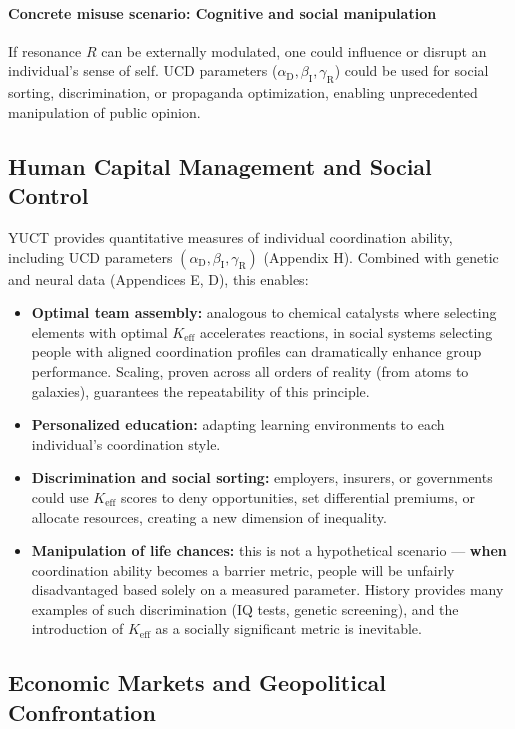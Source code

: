 \documentclass[12pt,a4paper]{article}
\theoremstyle{remark}
\newcommand{\Keff}{K_{\mathrm{eff}}}
\newcommand{\alD}{\alpha_{\mathrm{D}}}
\newcommand{\beI}{\beta_{\mathrm{I}}}
\newcommand{\gaR}{\gamma_{\mathrm{R}}}
\begin{document}
	\paragraph{Concrete misuse scenario: Cognitive and social manipulation}
	If resonance \(R\) can be externally modulated, one could influence or disrupt an individual's sense of self. UCD parameters (\(\alD,\beI,\gaR\)) could be used for social sorting, discrimination, or propaganda optimization, enabling unprecedented manipulation of public opinion.
	
	\subsection{Human Capital Management and Social Control}
	\label{subsec:human}
	
	YUCT provides quantitative measures of individual coordination ability, including UCD parameters \((\alD,\beI,\gaR)\) (Appendix H). Combined with genetic and neural data (Appendices E, D), this enables:
	\begin{itemize}[leftmargin=*]
		\item \textbf{Optimal team assembly:} analogous to chemical catalysts where selecting elements with optimal \(\Keff\) accelerates reactions, in social systems selecting people with aligned coordination profiles can dramatically enhance group performance. Scaling, proven across all orders of reality (from atoms to galaxies), guarantees the repeatability of this principle.
		\item \textbf{Personalized education:} adapting learning environments to each individual's coordination style.
		\item \textbf{Discrimination and social sorting:} employers, insurers, or governments could use \(\Keff\) scores to deny opportunities, set differential premiums, or allocate resources, creating a new dimension of inequality.
		\item \textbf{Manipulation of life chances:} this is not a hypothetical scenario — \textbf{when} coordination ability becomes a barrier metric, people will be unfairly disadvantaged based solely on a measured parameter. History provides many examples of such discrimination (IQ tests, genetic screening), and the introduction of \(\Keff\) as a socially significant metric is inevitable.
	\end{itemize}
	
	\subsection{Economic Markets and Geopolitical Confrontation}
	\label{subsec:econ}
	
\end{document}
